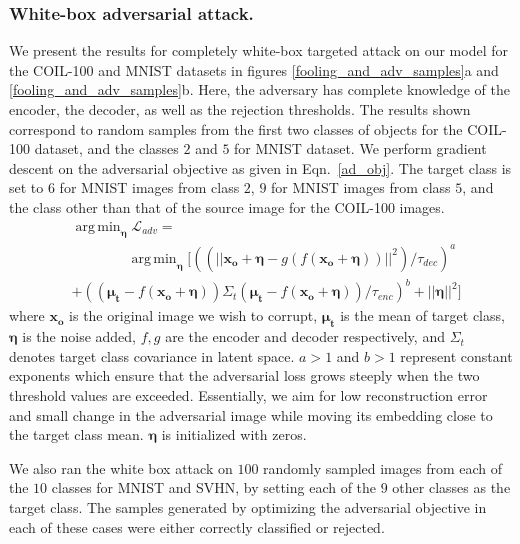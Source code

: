 \documentclass[letterpaper]{article} %
\DeclareMathOperator*{\argmin}{arg\,min}
\begin{document}
\subsubsection{White-box adversarial attack.}
\label{whitebox_attc_sec}
We present the results for completely white-box targeted attack on our model for the COIL-100 and MNIST datasets in figures \ref{fooling_and_adv_samples}a and \ref{fooling_and_adv_samples}b. Here, the adversary has complete knowledge of the encoder, the decoder, as well as the rejection thresholds. The results shown correspond to random samples from the first two classes of objects for the COIL-100 dataset, and the classes $2$ and $5$ for MNIST dataset. We perform gradient descent on the adversarial objective as given in Eqn.~\ref{ad_obj}. The target class is set to $6$ for MNIST images from class $2$, $9$ for MNIST images from class $5$, and the class other than that of the source image for the COIL-100 images.
\begin{equation}
\begin{split}
&\argmin_{\boldsymbol{\eta}}{\mathcal{L}_{adv}} = \\
& \qquad \qquad \argmin_\mathbf{\eta} [((||\mathbf{x_o} + \boldsymbol{\eta} - g(f(\mathbf{x_o} + \boldsymbol{\eta}))||^2)/\tau_{dec})^a \\
& + ((\mathbf{\mu_t} - f(\mathbf{x_o} + \mathbf{\eta}))\Sigma_t(\mathbf{\mu_t} - f(\mathbf{x_o} + \boldsymbol{\eta}))/\tau_{enc})^b + ||\boldsymbol{\eta}||^2]
\label{ad_obj}
\end{split}
\end{equation}
where $\mathbf{x_o}$ is the original image we wish to corrupt, $\boldsymbol{\mu_t}$ is the mean of target class, $\boldsymbol{\eta}$ is the noise added, $f, g$ are the encoder and decoder respectively, and $\Sigma_t$ denotes target class covariance in latent space. $a>1$ and $b>1$ represent constant exponents which ensure that the adversarial loss grows steeply when the two threshold values are exceeded. Essentially, we aim for low reconstruction error and small change in the adversarial image while moving its embedding close to the target class mean. $\boldsymbol{\eta}$ is initialized with zeros.

We also ran the white box attack on $100$ randomly sampled images from each of the $10$ classes for MNIST and SVHN, by setting each of the $9$ other classes as the target class. The samples generated by optimizing the adversarial objective in each of these cases were either correctly classified or rejected.
\end{document}

